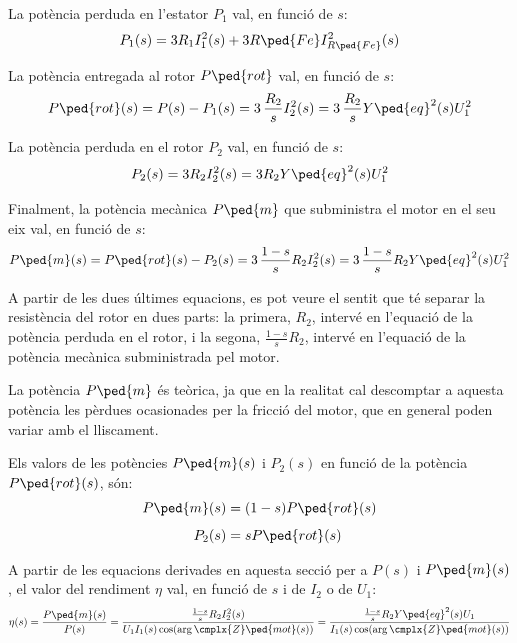 La potència perduda en l'estator $P_1$ val, en funció de $s$:
\begin{equation}
    P_1(s)  =  3 R_1 I_1^2(s) + 3 R\ped{Fe} I_{R\ped{Fe}}^2(s)
\end{equation}

La potència entregada al rotor $P\ped{rot}$  val, en funció de $s$:
\begin{equation}
    P\ped{rot}(s)  =  P(s) - P_1(s) = 3 \,\frac{R_2}{s} I_2^2(s) = 3 \,\frac{R_2}{s} Y\ped{eq}^2(s) U_1^2
\end{equation}

La potència perduda en el rotor $P_2$ val, en funció de $s$:
\begin{equation}
    P_2(s)  =  3 R_2 I_2^2(s) = 3 R_2 Y\ped{eq}^2(s) U_1^2
\end{equation}

Finalment, la potència mecànica $P\ped{m}$ que subministra el motor en el seu eix val, en funció de $s$:
\begin{equation}\index{motors d'inducció!potència mecànica}
    P\ped{m}(s)  =  P\ped{rot}(s) - P_2(s) = 3 \,\frac{1-s}{s} R_2 I_2^2(s) = 3 \,\frac{1-s}{s} R_2 Y\ped{eq}^2(s) U_1^2 \label{eq:Pm-I2-U1}
\end{equation}

A partir de les dues últimes equacions, es pot veure el sentit que té separar la resistència del rotor en dues parts: la primera, $R_2$,  intervé en l'equació de la potència perduda en el rotor, i la segona, $\frac{1-s}{s} R_2$,  intervé en l'equació de la potència mecànica subministrada pel motor.

La potència $P\ped{m}$  és teòrica, ja que en la realitat cal descomptar a aquesta potència les pèrdues ocasionades per la fricció del motor, que en general poden variar amb el lliscament.

Els valors de les potències $P\ped{m}(s)$ i  $P_2(s)$ en funció de la  potència    $P\ped{rot}(s)$, són:
\begin{subequations}
\begin{align}
    P\ped{m}(s) &=  (1-s) P\ped{rot}(s) \label{eq:Pm-Prot} \\[1ex]
    P_2(s) &=   s P\ped{rot}(s)
\end{align}
\end{subequations}

A partir de les equacions derivades en aquesta secció per a $P(s)$ i $P\ped{m}(s)$, el valor del rendiment $\eta$ val, en funció de $s$ i de $I_2$ o de $U_1$:
\begin{equation}\index{motors d'inducció!rendiment}
	\eta(s) = \frac{P\ped{m}(s)}{P(s)} = \frac{\frac{1-s}{s} R_2 I_2^2(s)}{U_1 I_1(s) \cos(\arg\cmplx{Z}\ped{mot}(s))} =  \frac{\frac{1-s}{s} R_2 Y\ped{eq}^2(s) U_1}{I_1(s) \cos(\arg\cmplx{Z}\ped{mot}(s))} \label{eq:mot-rendim}
\end{equation}

